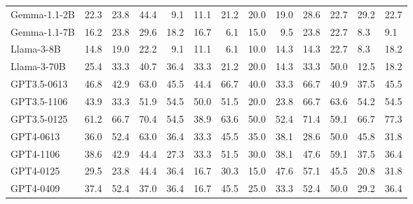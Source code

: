 \begin{table}
\begin{tabular}{l|rrrrrrrrllll}
         Gemma-1.1-2B& 22.3& 23.8& 44.4&9.1& 11.1&21.2 & 20.0&19.0 &28.6 &22.7 &29.2 &22.7\\
         Gemma-1.1-7B& 16.2& 23.8& 29.6&18.2& 16.7&6.1 & 15.0&9.5 &23.8 &22.7 &8.3 &9.1\\
         Llama-3-8B& 14.8& 19.0& 22.2&9.1& 11.1&6.1 & 10.0&14.3 &14.3 &22.7 &8.3 &18.2\\
         Llama-3-70B& 25.4& 33.3& 40.7&36.4& 33.3&21.2 & 20.0&14.3 &33.3 &50.0 &12.5 &18.2\\
         GPT3.5-0613& 46.8& 42.9& 63.0&45.5& 44.4&66.7 & 40.0&33.3 &66.7 &40.9 &37.5 &45.5\\
         GPT3.5-1106& 43.9& 33.3& 51.9&54.5& 50.0&51.5 & 20.0&23.8 &66.7 &63.6 &54.2 &54.5\\
         GPT3.5-0125& 61.2& 66.7& 70.4&54.5& 38.9&63.6 & 50.0&52.4 &71.4 &59.1 &66.7 &77.3\\
         GPT4-0613& 36.0& 52.4& 63.0&36.4& 33.3&45.5 & 35.0&38.1 &28.6 &50.0 &45.8 &31.8\\
         GPT4-1106& 38.6& 42.9& 44.4&27.3& 33.3&51.5 & 30.0&38.1 &47.6 &59.1 &37.5 &36.4\\
         GPT4-0125& 29.5& 23.8& 44.4&36.4& 16.7&30.3 & 15.0&47.6 &57.1 &45.5 &20.8 &31.8\\
         GPT4-0409& 37.4& 52.4& 37.0&36.4& 16.7&45.5 & 25.0&33.3 &52.4 &50.0 &29.2 &36.4\\
         \bottomrule
    \end{tabular}
\end{table}